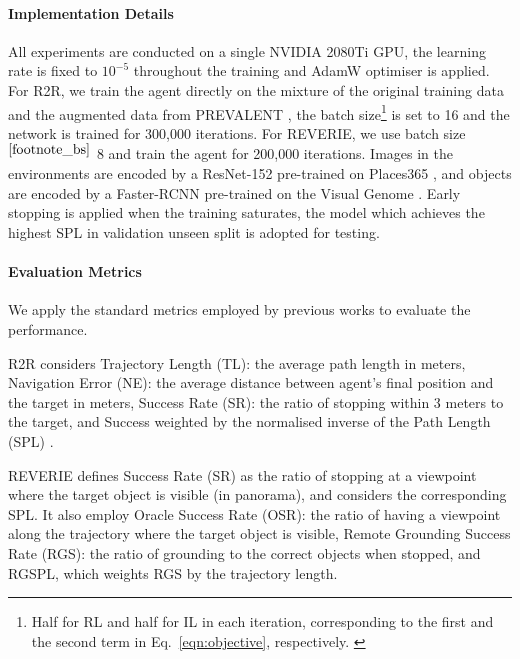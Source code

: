 \documentclass[final]{cvpr}
\begin{document}
\paragraph{Implementation Details}
All experiments are conducted on a single NVIDIA 2080Ti GPU, the learning rate is fixed to $10^{-5}$ throughout the training and AdamW optimiser \cite{loshchilov2018decoupled} is applied. For R2R, we train the agent directly on the mixture of the original training data and the augmented data from PREVALENT \cite{hao2020towards}, the batch size\footnote{Half for RL and half for IL in each iteration, corresponding to the first and the second term in Eq.~\ref{eqn:objective}, respectively. \label{footnote_bs}} is set to 16 and the network is trained for 300,000 iterations. For REVERIE, we use batch size$^{\ref{footnote_bs}}$ 8 and train the agent for 200,000 iterations. Images in the environments are encoded by a ResNet-152 \cite{he2016deep} pre-trained on Places365 \cite{zhou2017places}, and objects are encoded by a Faster-RCNN \cite{ren2015faster} pre-trained on the Visual Genome \cite{krishna2017visual}. Early stopping is applied when the training saturates, the model which achieves the highest SPL in validation unseen split is adopted for testing.

\vspace{-5pt}
\paragraph{Evaluation Metrics} 
We apply the standard metrics employed by previous works to evaluate the performance.

R2R \cite{anderson2018vision} considers Trajectory Length (TL): the average path length in meters, Navigation Error (NE): the average distance between agent's final position and the target in meters, Success Rate (SR): the ratio of stopping within 3 meters to the target, and Success weighted by the normalised inverse of the Path Length (SPL) \cite{anderson2018evaluation}.

REVERIE \cite{qi2020reverie} defines Success Rate (SR) as the ratio of stopping at a viewpoint where the target object is visible (in panorama), and considers the corresponding SPL. It also employ Oracle Success Rate (OSR): the ratio of having a viewpoint along the trajectory where the target object is visible, Remote Grounding Success Rate (RGS): the ratio of grounding to the correct objects when stopped, and RGSPL, which weights RGS by the trajectory length.
\end{document}
